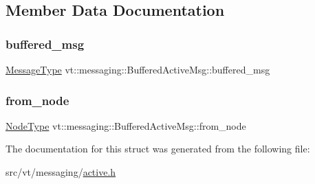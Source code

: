 \subsection{Member Data Documentation}
\mbox{\label{structvt_1_1messaging_1_1_buffered_active_msg_a88906175db478caa759a279ba6c43bea}} 
\subsubsection{\texorpdfstring{buffered\+\_\+msg}{buffered\_msg}}
{\footnotesize\ttfamily \hyperlink{structvt_1_1messaging_1_1_buffered_active_msg_a36c6d58d477907e916a251fb358f9154}{Message\+Type} vt\+::messaging\+::\+Buffered\+Active\+Msg\+::buffered\+\_\+msg}

\mbox{\label{structvt_1_1messaging_1_1_buffered_active_msg_a54ea3b62b0e7f9ec65d866c7afc82770}} 
\subsubsection{\texorpdfstring{from\+\_\+node}{from\_node}}
{\footnotesize\ttfamily \hyperlink{namespacevt_a866da9d0efc19c0a1ce79e9e492f47e2}{Node\+Type} vt\+::messaging\+::\+Buffered\+Active\+Msg\+::from\+\_\+node}



The documentation for this struct was generated from the following file\+:\begin{DoxyCompactItemize}
\item 
src/vt/messaging/\hyperlink{active_8h}{active.\+h}\end{DoxyCompactItemize}
